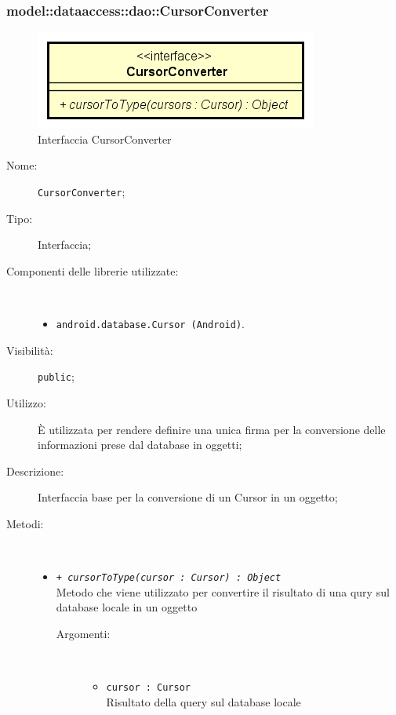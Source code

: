 \documentclass[../DefinizioneDiProdotto.tex]{subfiles}
\begin{document}
\subsubsection{model::dataaccess::dao::CursorConverter}

    \begin{figure}[H]
        \centering
        \includegraphics{img/CursorConverter.png}
        \caption{Interfaccia CursorConverter}\label{fig:model::dataaccess::dao::CursorConverter} 
    \end{figure}
    \begin{description}
\item[Nome:] \texttt{CursorConverter};
\item[Tipo:] Interfaccia;
\item[Componenti delle librerie utilizzate:] \
\begin{itemize}
\item \texttt{android.database.Cursor (Android)}.

\end{itemize}
\item[Visibilità:] \texttt{public};
\item[Utilizzo:] È utilizzata per rendere definire una unica firma per la conversione delle informazioni prese dal database in oggetti;
\item[Descrizione:] Interfaccia base per la conversione di un Cursor in un oggetto;
\item[Metodi:] \
\begin{itemize}
\item \texttt{+ \textit{cursorToType(cursor : Cursor) : Object}}\\
Metodo che viene utilizzato per convertire il risultato di una qury sul database locale in un oggetto
 \begin{description}
\item[Argomenti:] \
\begin{itemize}
\item \texttt{cursor : Cursor}\\
Risultato della query sul database locale\end{itemize}
\end{description}
\end{itemize}
\end{description}
\end{document}
